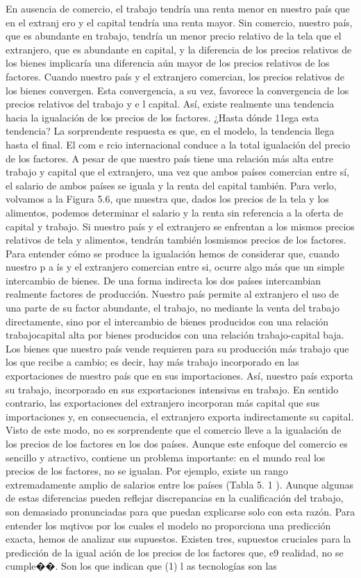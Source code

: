\documentclass[10pt,a4paper]{article}
\begin{document}
En ausencia de comercio, el trabajo tendría una renta menor en nuestro país que en el extranj ero y el capital tendría una renta mayor. Sin comercio, nuestro país, que es abundante en trabajo, tendría un menor precio relativo de la tela que el extranjero, que es abundante en capital, y la diferencia de los precios relativos de los bienes implicaría una diferencia aún mayor de los precios relativos de los factores. Cuando nuestro país y el extranjero comercian, los precios relativos de los bienes convergen. Esta convergencia, a su vez, favorece la convergencia de los precios relativos del trabajo y e l capital. Así, existe realmente una tendencia hacia la igualación de los precios de los factores. ¿Hasta dónde 11ega esta tendencia? La sorprendente respuesta es que, en el modelo, la tendencia llega hasta el final. El com e rcio internacional conduce a la total igualación del precio de los factores. A pesar de que nuestro país tiene una relación más alta entre trabajo y capital que el extranjero, una vez que ambos países comercian entre sí, el salario de ambos países se iguala y la renta del capital también. Para verlo, volvamos a la Figura 5.6, que muestra que, dados los precios de la tela y los alimentos, podemos determinar el salario y la renta sin referencia a la oferta de capital y trabajo. Si nuestro país y el extranjero se enfrentan a los mismos precios relativos de tela y alimentos, tendrán también losmismos precios de los factores. Para entender cómo se produce la igualación hemos de considerar que, cuando nuestro p a ís y el extranjero comercian entre si, ocurre algo más que un simple intercambio de bienes. De una forma indirecta los dos países intercambian realmente factores de producción. Nuestro país permite al extranjero el uso de una parte de su factor abundante, el trabajo, no mediante la venta del trabajo directamente, sino por el intercambio de bienes producidos con una relación trabajocapital alta por bienes producidos con una relación trabajo-capital baja. Los bienes que nuestro país vende requieren para su producción más trabajo que los que recibe a cambio; es decir, hay más trabajo incorporado en las exportaciones de nuestro país que en sus importaciones. Así, nuestro país exporta su trabajo, incorporado en sus exportaciones intensivas en trabajo. En sentido contrario, las exportaciones del extranjero incorporan más capital que sus importaciones y, en consecuencia, el extranjero exporta indirectamente su capital. Visto de este modo, no es sorprendente que el comercio lleve a la igualación de los precios de los factores en los dos países. Aunque este enfoque del comercio es sencillo y atractivo, contiene un problema importante: en el mundo real los precios de los factores, no se igualan. Por ejemplo, existe un rango extremadamente amplio de salarios entre los países (Tabla 5. 1 ). Aunque algunas de estas diferencias pueden reflejar discrepancias en la cualificación del trabajo, son demasiado pronunciadas para que puedan explicarse solo con esta razón. Para entender los mqtivos por los cuales el modelo no proporciona una predicción exacta, hemos de analizar sus supuestos. Existen tres, supuestos cruciales para la predicción de la igual ación de los precios de los factores que, e9 realidad, no se cumple��. Son los que indican que (1) l as tecnologías son las 
\end{document}
